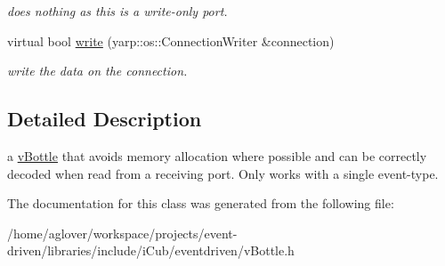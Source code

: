\begin{DoxyCompactItemize}
\begin{DoxyCompactList}\small\item\em does nothing as this is a write-\/only port. \end{DoxyCompactList}\item 
virtual bool \hyperlink{classev_1_1vBottleMimic_a39ad9b924890d8f8f717f49b6c5ad23f}{write} (yarp\+::os\+::\+Connection\+Writer \&connection)\hypertarget{classev_1_1vBottleMimic_a39ad9b924890d8f8f717f49b6c5ad23f}{}\label{classev_1_1vBottleMimic_a39ad9b924890d8f8f717f49b6c5ad23f}

\begin{DoxyCompactList}\small\item\em write the data on the connection. \end{DoxyCompactList}\end{DoxyCompactItemize}


\subsection{Detailed Description}
a \hyperlink{classev_1_1vBottle}{v\+Bottle} that avoids memory allocation where possible and can be correctly decoded when read from a receiving port. Only works with a single event-\/type. 

The documentation for this class was generated from the following file\+:\begin{DoxyCompactItemize}
\item 
/home/aglover/workspace/projects/event-\/driven/libraries/include/i\+Cub/eventdriven/v\+Bottle.\+h\end{DoxyCompactItemize}
